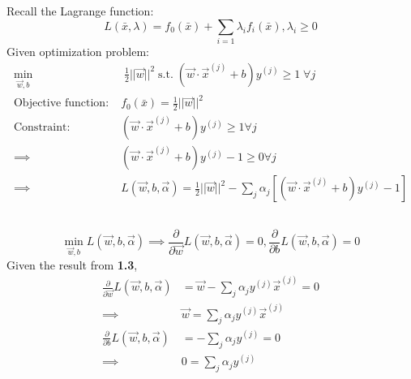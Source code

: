 \documentclass{article}
\DeclareMathOperator*{\minimize}{min}
\begin{document}
\subsection{}
Recall the Lagrange function: $$ L (\bar{x}, \lambda) = f_0 (\bar{x}) + \sum_{i=1} \lambda_i f_i (\bar{x}), \lambda_i \geq 0 $$
Given optimization problem:
\begin{align*}
 \displaystyle{\minimize_{\vec{w}, b}} & \; \frac{1}{2} || \vec{w}||^2 \; \text{s.t.} \; (\vec{w} \cdot \vec{x}^{(j)} + b)y^{(j)} \geq 1 \; \forall j \\
\text{Objective function:} \; & f_0(\bar{x}) = \frac{1}{2} || \vec{w} || ^2 \\
\text{Constraint:} \; & (\vec{w} \cdot \vec{x}^{(j)} + b)y^{(j)} \geq 1 \forall j \\
\implies & (\vec{w} \cdot \vec{x}^{(j)} + b)y^{(j)} -1 \geq 0 \forall j \\
\implies &\boxed{	L(\vec{w}, b, \vec{\alpha}) = \frac{1}{2} || \vec{w} || ^2 - \sum_j \alpha_j [ (\vec{w} \cdot \vec{x}^{(j)} + b)y^{(j)} -1]}
\end{align*}



\subsection{}
$$ \displaystyle{\minimize_{\vec{w}, b}} L(\vec{w}, b, \vec{\alpha}) \implies \frac{\partial}{\partial \vec{w}} L(\vec{w}, b, \vec{\alpha}) = 0,  \frac{\partial }{\partial b} L(\vec{w}, b, \vec{\alpha}) = 0 $$
Given the result from \textbf{1.3}, \\
\begin{align*}
 \frac{\partial}{\partial \vec{w}} L(\vec{w}, b, \vec{\alpha}) &= \vec{w} - \sum_j \alpha_j y^{(j)} \vec{x}^{(j)} = 0 \\
 \implies & \boxed{\vec{w} =  \sum_j \alpha_j y^{(j)} \vec{x}^{(j)}} \\
  \frac{\partial}{\partial b} L(\vec{w}, b, \vec{\alpha}) &= - \sum_j \alpha_j y^{(j)} = 0 \\
  \implies & \boxed{0 = \sum_j \alpha_j y^{(j)}}
\end{align*}
\end{document}
